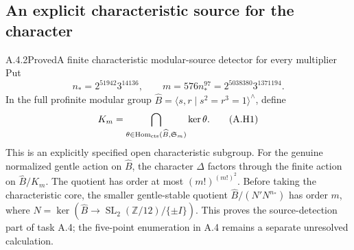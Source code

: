 \subsection{An explicit characteristic source for the character}

\begin{result}{A.4.2}{Proved}{A finite characteristic modular-source detector for every multiplier}
Put
\[
 n_*=2^{51942}3^{14136},\qquad
 m=576n_*^{97}=2^{5038380}3^{1371194}.
\]
In the full profinite modular group
$\widehat B=\langle s,r\mid s^2=r^3=1\rangle^\wedge$, define
\[
 K_m=\bigcap_{\theta\in
       \operatorname{Hom}_{\rm cts}(\widehat B,\mathfrak S_m)}
                      \ker\theta .
 \tag{A.H1}
\]
This is an explicitly specified open characteristic subgroup.
For the genuine normalized gentle action on $\widehat B$, the character
$\Delta$ factors through the finite action on $\widehat B/K_m$.
The quotient has order at most $(m!)^{(m!)^2}$.
Before taking the characteristic core, the smaller gentle-stable
quotient $\widehat B/(N'N^{n_*})$ has order $m$, where
$N=\ker(\widehat B\to\operatorname{SL}_2(\mathbb Z/12)/\{\pm I\})$.
This proves the source-detection part of task A.4; the five-point
enumeration in A.4 remains a separate unresolved calculation.
\end{result}
